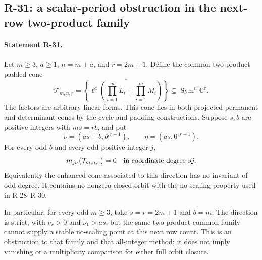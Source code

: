 \subsection{R-31: a scalar-period obstruction in the next-row two-product family}

\paragraph{Statement R-31.}
Let $m\geq3$, $a\geq1$, $n=m+a$, and $r=2m+1$. Define the
common two-product padded cone
\[
 \mathcal T_{m,n,r}
 =\overline{\left\{\ell^a\left(\prod_{i=1}^m L_i+
                         \prod_{i=1}^m M_i\right)\right\}}
                       \subseteq\operatorname{Sym}^n\mathbb C^r.
\]
The factors are arbitrary linear forms. This cone lies in both
projected permanent and determinant cones by the cycle and
padding constructions. Suppose $s,b$ are positive integers with
$ms=rb$, and put
\[
 \nu=(as+b,b^{,r-1}),\qquad \eta=(as,0^{,r-1}).
\]
For every odd $b$ and every odd positive integer $j$,
\begin{equation}\label{R31:odd_vanishing}
 m_{j\nu}\bigl(\mathcal T_{m,n,r}\bigr)=0
       \quad\hbox{in coordinate degree }sj.
\end{equation}
Equivalently the enhanced cone associated to this direction
has no invariant of odd degree. It contains no nonzero closed
orbit with the no-scaling property used in R-28--R-30.

In particular, for every odd $m\geq3$, take $s=r=2m+1$ and
$b=m$. The direction is strict, with $\nu_r>0$ and $\nu_1>as$,
but the same two-product common family cannot supply a stable
no-scaling point at this next row count. This is an obstruction
to that family and that all-integer method; it does not imply
vanishing or a multiplicity comparison for either full orbit
closure.

